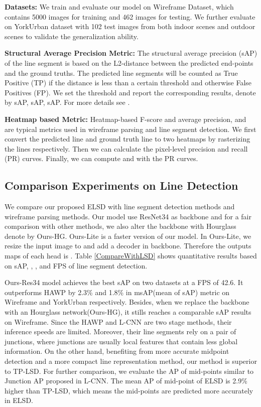 \documentclass[10pt,twocolumn,letterpaper]{article}
\begin{document}
\textbf{Datasets:}
We train and evaluate our model on Wireframe Dataset\cite{wireframe_cvpr18}, which contains 5000 images for training and 462 images for testing. We further evaluate on YorkUrban dataset\cite{York} with 102 test images from both indoor scenes and outdoor scenes to validate the generalization ability.

\textbf{Structural Average Precision Metric\cite{LCNN}:} The structural average precision (sAP) of the line segment is based on the L2-distance between the predicted end-points and the ground truths. The predicted line segments will be counted as 
True Positive (TP) if the distance is less than a certain threshold  and otherwise False Positives (FP). We set the threshold  and report the corresponding results, denote by sAP, sAP, sAP. For more details see \cite{LCNN}.



\textbf{Heatmap based Metric\cite{LCNN}:} Heatmap-based F-score and average precision,  and  are typical metrics used in wireframe parsing and line segment detection. We first convert the predicted line and ground truth line to two heatmaps by rasterizing the lines respectively. Then we can calculate the pixel-level precision and recall (PR) curves. Finally, we can compute  and  with the PR curves.

\subsection{Comparison Experiments on Line Detection}

We compare our proposed ELSD with line segment detection methods and wireframe parsing methods. Our model use ResNet34 as backbone and for a fair comparison with other methods, we also alter the backbone with Hourglass denote by Ours-HG. Ours-Lite is a faster version of our model. In Ours-Lite, we resize the input image to  and add a decoder in backbone. Therefore the outputs maps of each head is . Table \ref{CompareWithLSD} shows quantitative results based on sAP, , , and FPS of line segment detection. 

Ours-Res34 model achieves the best sAP on two datasets at a FPS of 42.6. It outperforms HAWP by 2.3\% and 1.8\% in msAP(mean of sAP) metric on Wireframe and YorkUrban respectively. Besides, when we replace the backbone with an Hourglass network(Ours-HG), it stills reaches a comparable sAP results on Wireframe. Since the HAWP and L-CNN are two stage methods, their inference speeds are limited. Moreover, their line segments rely on a pair of junctions, where junctions are usually local features that contain less global information. On the other hand, benefiting from more accurate midpoint detection and a more compact line representation method, our method is superior to TP-LSD. For further comparison, we evaluate the AP of mid-points similar to Junction AP proposed in L-CNN\cite{LCNN}. The mean AP of mid-point of ELSD is 2.9\% higher than TP-LSD, which means the mid-points are predicted more accurately in ELSD. 
\end{document}
